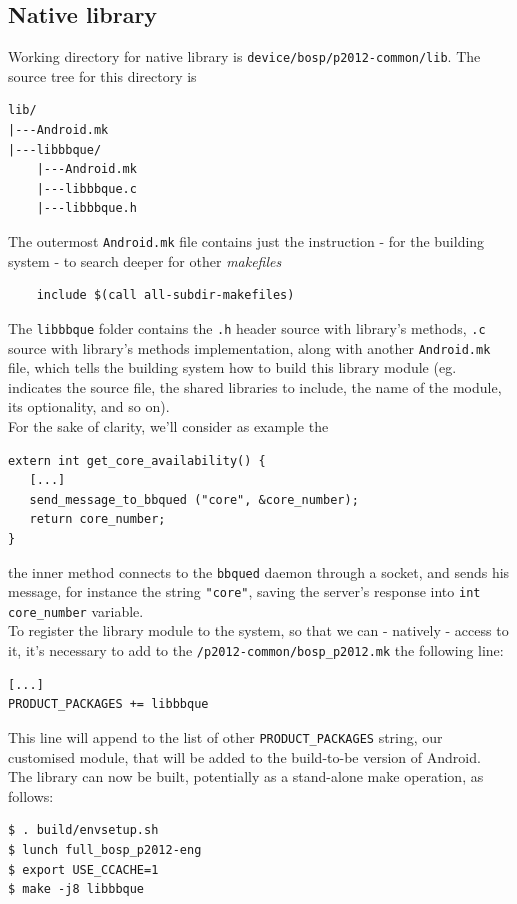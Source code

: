 \subsection{Native library}
Working directory for native library is \texttt{device/bosp/p2012-common/lib}.
The source tree for this directory is
\begin{verbatim}
lib/
|---Android.mk
|---libbbque/
    |---Android.mk
    |---libbbque.c
    |---libbbque.h
\end{verbatim}
The outermost \texttt{Android.mk} file contains just the instruction - for the building system - to search deeper for other \textit{makefiles}
\begin{verbatim}
	include $(call all-subdir-makefiles)
\end{verbatim}
The \texttt{libbbque} folder contains the \texttt{.h} header source with library's methods, \texttt{.c} source with library's methods implementation, along with another \texttt{Android.mk} file, which tells the building system how to build this library module (eg. indicates the source file, the shared libraries to include, the name of the module, its optionality, and so on).\\
For the sake of clarity, we'll consider as example the
\begin{verbatim}
extern int get_core_availability() {
   [...]
   send_message_to_bbqued ("core", &core_number);
   return core_number;
}
\end{verbatim}
the inner method connects to the \texttt{bbqued} daemon through a socket, and sends his message, for instance the string \texttt{"core"}, saving the server's response into \texttt{int core\_number} variable.\\
To register the library module to the system, so that we can - natively - access to it, it's necessary to add to the \texttt{/p2012-common/bosp\_p2012.mk} the following line:
\begin{verbatim}
[...]
PRODUCT_PACKAGES += libbbque
\end{verbatim}
This line will append to the list of other \texttt{PRODUCT\_PACKAGES} string, our customised module, that will be added to the build-to-be version of Android.\\
The library can now be built, potentially as a stand-alone make operation, as follows:
\begin{verbatim}
$ . build/envsetup.sh
$ lunch full_bosp_p2012-eng
$ export USE_CCACHE=1
$ make -j8 libbbque
\end{verbatim}
